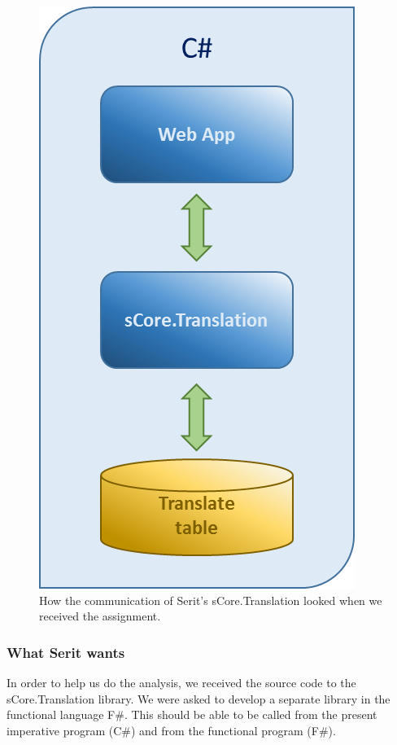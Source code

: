 \documentclass[12pt, a4paper]{article}
\begin{document}
\begin{figure}[!h]
    \includegraphics[scale=0.4]{image00}
    \centering
    \caption{How the communication of Serit's sCore.Translation looked when we received the assignment.}
\end{figure}

\newpage
\subsubsection{What Serit wants}

In order to help us do the analysis, we received the source code to the sCore.Translation library. We were asked to develop a separate library in the functional language F\#. This should be able to be called from the present imperative program (C\#) and from the functional program (F\#).\\
\end{document}
